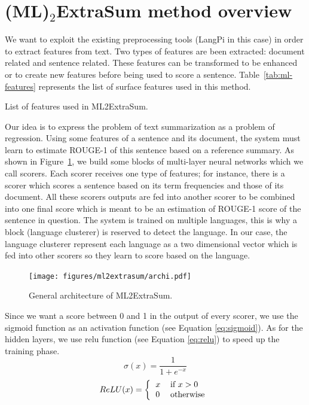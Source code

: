 \section{(ML)$_\text{2}$ExtraSum method overview}

We want to exploit the existing preprocessing tools (LangPi in this case) in order to extract features from text. 
Two types of features are been extracted: document related and sentence related. 
These features can be transformed to be enhanced or to create new features  before being used to score a sentence.
Table~\ref{tab:ml-features} represents the list of surface features used in this method.
\begin{table}[!ht]
	\centering
	\caption{List of features used in ML2ExtraSum.}
	\label{tab:ml-features}
\end{table}

Our idea is to express the problem of text summarization as a problem of regression. 
Using some features of a sentence and its document, the system must learn to estimate ROUGE-1 of this sentence based on a reference summary. 
As shown in Figure~\ref{fig:ml2extrasum-archi}, we build some blocks of multi-layer neural networks which we call scorers. 
Each scorer receives one type of features; for instance, there is a scorer which scores a sentence based on its term frequencies and those of its document. 
All these scorers outputs are fed into another scorer to be combined into one final score which is meant to be an estimation of ROUGE-1 score of the sentence in question. 
The system is trained on multiple languages, this is why a block (language clusterer) is reserved to detect the language.
In our case, the language clusterer represent each language as a two dimensional vector which is fed into other scorers so they learn to score based on the language. 

\begin{figure}[ht]
	\centering
	\texttt{[image: figures/ml2extrasum/archi.pdf]} %
	\caption{General architecture of ML2ExtraSum.}
	\label{fig:ml2extrasum-archi}
\end{figure}


Since we want a score between 0 and 1 in the output of every scorer, we use the sigmoid function as an activation function (see Equation \ref{eq:sigmoid}). 
As for the hidden layers, we use \ac{relu} function (see Equation \ref{eq:relu}) to speed up the training phase. 
\begin{equation}
\label{eq:sigmoid}
\sigma(x) = \frac{1}{1 + e^{-x}}
\end{equation}
%
\begin{equation}
\label{eq:relu}
ReLU(x) = \left\lbrace\begin{tabular}{ll}
$ x $ & if $ x > 0 $\\
$ 0 $ & otherwise \\
\end{tabular}\right. 
\end{equation}

